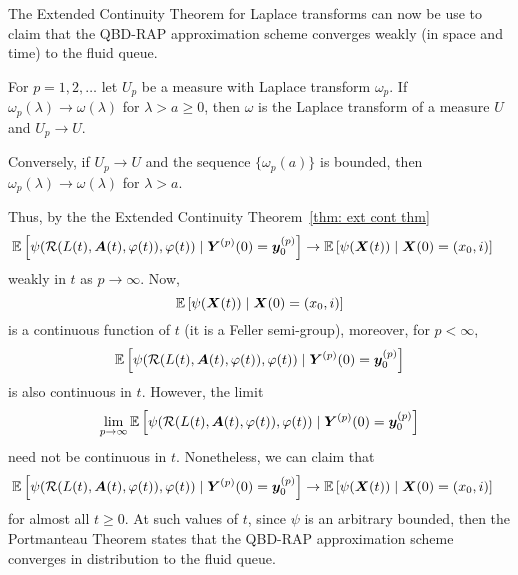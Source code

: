 The Extended Continuity Theorem for Laplace transforms \cite[Chapter XIII, Theorem 2a]{feller1957} can now be use to claim that the QBD-RAP approximation scheme converges weakly (in space and time) to the fluid queue.
\begin{thm}\label{thm: ext cont thm}
	For \(p=1,2,\dots\) let \(U_p\) be a measure with Laplace transform \(\omega_p\). If \(\omega_p(\lambda)\to\omega(\lambda)\) for \(\lambda > a\geq 0\), then \(\omega\) is the Laplace transform of a measure \(U\) and \(U_p\to U\).
	
	Conversely, if \(U_p\to U\) and the sequence \(\{\omega_p(a)\}\) is bounded, then \(\omega_p(\lambda)\to\omega(\lambda)\) for \(\lambda >a\). 
\end{thm}
Thus, by the the Extended Continuity Theorem~\ref{thm: ext cont thm}
\begin{align}
		&\mathbb E\left[\psi( \mathcal R(L(t),\boldsymbol A(t),\varphi(t)),\varphi(t) )   \mid \boldsymbol Y^{(p)}(0)=\boldsymbol y_0^{(p)} \right] \nonumber 
		\to \mathbb E\left[\psi({\boldsymbol X}(t))\mid \boldsymbol X(0)=(x_0, i) \right] \nonumber
\end{align}
weakly in \(t\) as \(p\to \infty\). Now, 
\[\mathbb E\left[\psi({\boldsymbol X}(t))\mid \boldsymbol X(0)=(x_0,i) \right]\] 
is a continuous function of \(t\) (it is a Feller semi-group), moreover, for \(p<\infty\), 
\[\mathbb E\left[\psi( \mathcal R(L(t),\boldsymbol A(t),\varphi(t)),\varphi(t) )   \mid \boldsymbol Y^{(p)}(0)=\boldsymbol y_0^{(p)} \right]  \]
 is also continuous in \(t\). However, the limit 
 \[\lim\limits_{p\to\infty}\mathbb E\left[\psi( \mathcal R(L(t),\boldsymbol A(t),\varphi(t)),\varphi(t) ) \mid \boldsymbol Y^{(p)}(0)=\boldsymbol y_0^{(p)}\right]  \] need not be continuous in \(t\). Nonetheless, we can claim that 
\begin{align}
		&\mathbb E\left[\psi( \mathcal R(L(t),\boldsymbol A(t),\varphi(t)),\varphi(t) )    \mid \boldsymbol Y^{(p)}(0)=\boldsymbol y_0^{(p)}\right]  \nonumber
		\to \mathbb E\left[\psi({\boldsymbol X}(t) )\mid \boldsymbol X(0)=(x_0, i) \right] \nonumber
\end{align}
for almost all \(t\geq 0\). At such values of \(t\), since \(\psi\) is an arbitrary bounded, then the Portmanteau Theorem \citep[Theorem 2.1, page 16]{billingsleyconvergence} states that the QBD-RAP approximation scheme converges in distribution to the fluid queue.

